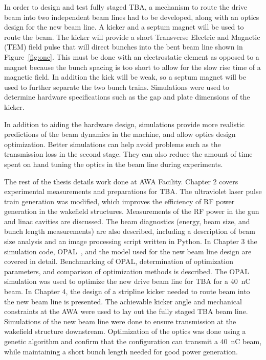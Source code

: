  \label{sec:requirements}

In order to design and test fully staged TBA, a mechanism to route the drive beam into two independent beam lines had to be developed, along with an optics design for the new beam line. A kicker and a septum magnet will be used to route the beam. 
The kicker will provide a short Transverse Electric and Magnetic (TEM) field pulse
that will direct bunches into the bent beam line shown in Figure~\ref{fig:one}. 
This must be done with an electrostatic element as opposed to a magnet because 
the bunch spacing is too short to allow for the slow rise time of a magnetic field.
In addition the kick will be weak, so a septum magnet will be used to further
separate the two bunch trains. Simulations were used to determine hardware specifications such as the gap and plate dimensions of the kicker.

In addition to aiding the hardware design, simulations provide more realistic predictions of the beam dynamics in the machine, and allow optics design optimization.
Better simulations can help avoid problems such as the transmission loss in the second stage.
They can also reduce the amount of time spent on hand tuning the optics in the 
beam line during experiments.






The rest of the thesis details work done at AWA Facility.
Chapter 2 covers experimental measurements and preparations for TBA.
The ultraviolet laser pulse train generation was modified, 
which improves the efficiency of RF power generation in the wakefield structures.
Measurements of the RF power in the gun and linac cavities are discussed.  
The beam diagnostics (energy, beam size, and bunch length measurements) are also described, including a description of beam size analysis and an image processing script written in Python. 
In Chapter 3 the simulation code, OPAL~\cite{opal}, and the model used for the new beam line design are covered in detail.
Benchmarking of OPAL, determination of optimization parameters, and comparison of optimization methods is described.  The OPAL simulation was used to optimize the new drive beam line for TBA for a \SI{40}{nC} beam. 
In Chapter 4, the design of a stripline kicker needed to route beam into the new beam line is presented.
The achievable kicker angle and mechanical constraints at the AWA 
were used to lay out the fully staged TBA beam line. 
Simulations of the new beam line were done to ensure transmission at
the wakefield structure downstream. Optimization of the optics was done using 
a genetic algorithm and confirm that the configuration can transmit a \SI{40}{nC} beam, while maintaining a short bunch length needed for good power generation.



